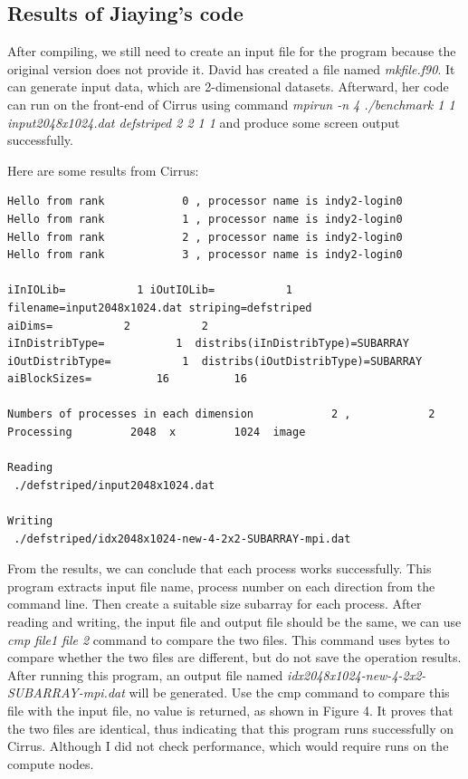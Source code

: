 \documentclass{article}
\begin{document}
\subsection{Results of Jiaying's code}
After compiling, we still need to create an input file for the program because the original version does not provide it. David has created a file named \textit{mkfile.f90}. It can generate input data, which are 2-dimensional datasets. Afterward, her code can run on the front-end of Cirrus using command \textit{mpirun -n 4 ./benchmark 1 1 input2048x1024.dat defstriped 2 2 1 1} and produce some screen output successfully.

Here are some results from Cirrus:

\begin{verbatim}
Hello from rank            0 , processor name is indy2-login0
Hello from rank            1 , processor name is indy2-login0
Hello from rank            2 , processor name is indy2-login0
Hello from rank            3 , processor name is indy2-login0

iInIOLib=           1 iOutIOLib=           1
filename=input2048x1024.dat striping=defstriped
aiDims=           2           2
iInDistribType=           1  distribs(iInDistribType)=SUBARRAY
iOutDistribType=           1  distribs(iOutDistribType)=SUBARRAY
aiBlockSizes=          16          16

Numbers of processes in each dimension            2 ,            2
Processing         2048  x         1024  image

Reading
 ./defstriped/input2048x1024.dat
 
Writing
 ./defstriped/idx2048x1024-new-4-2x2-SUBARRAY-mpi.dat
\end{verbatim}

From the results, we can conclude that each process works successfully. This program extracts input file name, process number on each direction from the command line. Then create a suitable size subarray for each process.
After reading and writing, the input file and output file should be the same, we can use \textit{cmp file1 file 2} command to compare the two files.
This command uses bytes to compare whether the two files are different, but do not save the operation results. After running this program, an output file named \textit{idx2048x1024-new-4-2x2-SUBARRAY-mpi.dat} will be generated. Use the cmp command to compare this file with the input file, no value is returned, as shown in Figure 4. It proves that the two files are identical, thus indicating that this program runs successfully on Cirrus. Although I did not check performance, which would require runs on the compute nodes.
\end{document}
